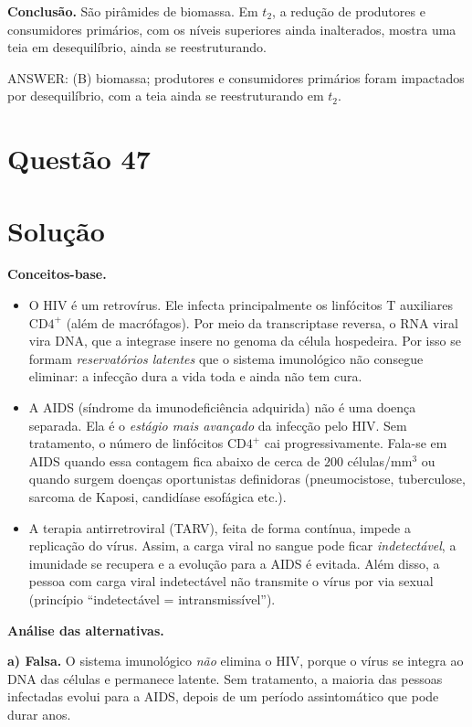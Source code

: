 \documentclass{article}%
\begin{document}
\textbf{Conclusão.} São pirâmides de biomassa. Em $t_2$, a redução de produtores e consumidores primários, com os níveis superiores ainda inalterados, mostra uma teia em desequilíbrio, ainda se reestruturando.

ANSWER: (B) biomassa; produtores e consumidores primários foram impactados por desequilíbrio, com a teia ainda se reestruturando em $t_2$.%
\newpage%
\section*{Questão 47}

\section*{Solução}

\textbf{Conceitos-base.}
\begin{itemize}
\item O HIV é um retrovírus. Ele infecta principalmente os linfócitos T auxiliares $\text{CD4}^{+}$ (além de macrófagos). Por meio da transcriptase reversa, o RNA viral vira DNA, que a integrase insere no genoma da célula hospedeira. Por isso se formam \emph{reservatórios latentes} que o sistema imunológico não consegue eliminar: a infecção dura a vida toda e ainda não tem cura.
\item A AIDS (síndrome da imunodeficiência adquirida) não é uma doença separada. Ela é o \emph{estágio mais avançado} da infecção pelo HIV. Sem tratamento, o número de linfócitos $\text{CD4}^{+}$ cai progressivamente. Fala-se em AIDS quando essa contagem fica abaixo de cerca de $200$ células/mm$^3$ ou quando surgem doenças oportunistas definidoras (pneumocistose, tuberculose, sarcoma de Kaposi, candidíase esofágica etc.).
\item A terapia antirretroviral (TARV), feita de forma contínua, impede a replicação do vírus. Assim, a carga viral no sangue pode ficar \emph{indetectável}, a imunidade se recupera e a evolução para a AIDS é evitada. Além disso, a pessoa com carga viral indetectável não transmite o vírus por via sexual (princípio ``indetectável = intransmissível'').
\end{itemize}

\textbf{Análise das alternativas.}

\textbf{a) Falsa.} O sistema imunológico \emph{não} elimina o HIV, porque o vírus se integra ao DNA das células e permanece latente. Sem tratamento, a maioria das pessoas infectadas evolui para a AIDS, depois de um período assintomático que pode durar anos.
\end{document}
